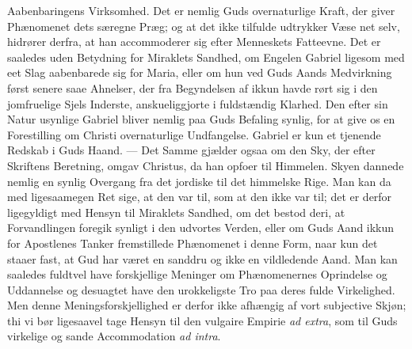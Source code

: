 \documentclass[12pt]{book}
\newcommand{\opage}[1]{\marginnote{\footnotesize\textit{[#1]}}}
\begin{document}
Aabenbaringens Virksomhed. Det er nemlig Guds overnaturlige Kraft, der giver
Phænomenet dets særegne Præg; og at det ikke tilfulde udtrykker Væse\-%
\opage{158}%
net selv, hidrører derfra, at han accommoderer sig efter Menneskets Fatteevne.
Det er saaledes uden Betydning for Miraklets Sandhed, om Engelen Gabriel ligesom
med eet Slag aabenbarede sig for Maria, eller om hun ved Guds Aands Medvirkning
først senere saae Ahnelser, der fra Begyndelsen af ikkun havde rørt sig i den
jomfruelige Sjels Inderste, anskueliggjorte i fuldstændig Klarhed. Den efter sin
Natur usynlige Gabriel bliver nemlig paa Guds Befaling synlig, for at give os en
Forestilling om Christi overnaturlige Undfangelse. Gabriel er kun et tjenende
Redskab i Guds Haand. --- Det Samme gjælder ogsaa om den Sky, der efter
Skriftens Beretning, omgav Christus, da han opfoer til Himmelen. Skyen dannede
nemlig en synlig Overgang fra det jordiske til det himmelske Rige. Man kan da
med ligesaamegen Ret sige, at den var til, som at den ikke var til; det er
derfor ligegyldigt med Hensyn til Miraklets Sandhed, om det bestod deri, at
Forvandlingen foregik synligt i den udvortes Verden, eller om Guds Aand ikkun
for Apostlenes Tanker fremstillede Phænomenet i denne Form, naar kun det staaer
fast, at Gud har været en sanddru og ikke en vildledende Aand. Man kan saaledes
fuldtvel have forskjellige Meninger om Phænomenernes Oprindelse og Uddannelse og
desuagtet have den urokkeligste Tro paa deres fulde Virkelighed. Men denne
Meningsforskjellighed er derfor ikke afhængig af vort subjective Skjøn; thi vi
bør ligesaavel tage Hensyn til den vulgaire Empirie \textit{ad extra}, som til
Guds virkelige og sande Accommodation \textit{ad intra}.
\end{document}
